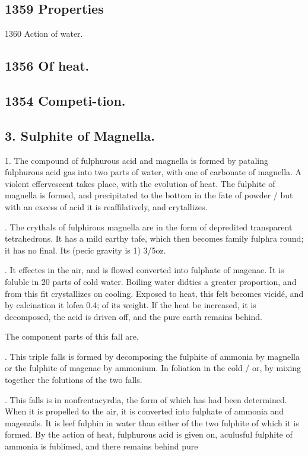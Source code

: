 \subsection*{1359
Properties}
1360
Action of
water.\par\medskip
\subsection*{1356
Of heat.}
\subsection*{1354
Competi-tion.}
\subsection*{3. Sulphite of Magnella.}
1. The compound of fulphurous acid and magnella is formed by pataling fulphurous acid gas into two parts of water, with one of carbonate of magnella. A violent effervescent takes place, with the evolution of heat. The fulphite of magnella is formed, and precipitated to the bottom in the fate of powder / but with an excess of acid it is reaffilatively, and crytallizes.\par{}. The crythals of fulphirous magnella are in the form of depredited transparent tetrahedrons. It has a mild earthy tafe, which then becomes family fulphra round; it has no final. Its (pecic gravity is 1) 3/5oz.\par{}. It effectes in the air, and is flowed converted into fulphate of magenae. It is foluble in 20 parts of cold water. Boiling water didtics a greater proportion, and from this fit crystallizes on cooling. Exposed to heat, this felt becomes vicidé, and by calcination it lofea 0.4; of its weight. If the heat be increased, it is decomposed, the acid is driven off, and the pure earth remains behind.\par\medskip
The component parts of this fall are,\par{}. This triple falls is formed by decomposing the fulphite of ammonia by magnella or the fulphite of magenae by ammonium. In foliation in the cold / or, by mixing together the folutions of the two falls.\par{}. This falls is in nonfrentacyrdia, the form of which has had been determined. When it is propelled to the air, it is converted into fulphate of ammonia and magenails. It is leef fulphin in water than either of the two fulphite of which it is formed. By the action of heat, fulphurous acid is given on, aculusful fulphite of ammonia is fublimed, and there remains behind pure\par\medskip
